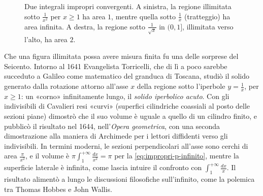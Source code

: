 \begin{figure}[htb]
\centering
{}
\caption{Due integrali impropri convergenti. A sinistra, la regione illimitata sotto
$\frac1{x^{2}}$ per $x\ge1$ ha area $1$, mentre quella sotto $\frac1x$ (tratteggio) ha area
infinita. A destra, la regione sotto $\frac1{\sqrt x}$ in $(0,1]$, illimitata verso l'alto, ha
area $2$.}
\label{fig:impropri}
\end{figure}

\begin{notastorica}
Che una figura illimitata possa avere misura finita fu una delle sorprese del Seicento.
Intorno al 1641 Evangelista Torricelli, che di lì a poco sarebbe succeduto a Galileo come
matematico del granduca di Toscana, studiò il solido generato dalla rotazione attorno
all'asse $x$ della regione sotto l'iperbole $y=\frac1x$, per $x\ge1$: un «corno»
infinitamente lungo, il \emph{solido iperbolico acuto}. Con gli indivisibili di Cavalieri
resi «curvi» (superfici cilindriche coassiali al posto delle sezioni piane) dimostrò che
il suo volume è uguale a quello di un cilindro finito, e pubblicò il risultato nel 1644,
nell'\emph{Opera geometrica}, con una seconda dimostrazione alla maniera di Archimede per
i lettori diffidenti verso gli indivisibili. In termini moderni, le sezioni
perpendicolari all'asse sono cerchi di area $\frac\pi{x^{2}}$, e il volume è
$\pi\int_{1}^{+\infty}\frac{dx}{x^{2}}=\pi$ per la \eqref{eq:impropri-p-infinito}, mentre la
superficie laterale è infinita, come lascia intuire il confronto con $\int_{1}^{+\infty}\frac{dx}x$.
Il risultato alimentò a lungo le discussioni filosofiche sull'infinito, come la polemica
tra Thomas Hobbes e John Wallis.
\end{notastorica}

